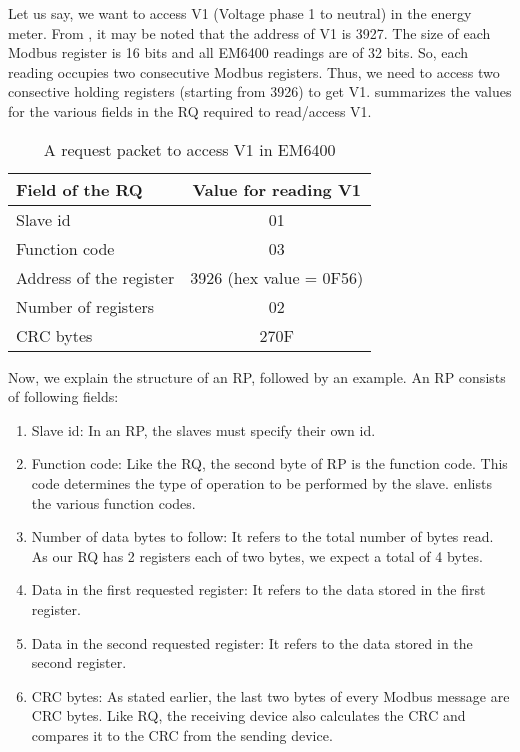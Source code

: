 Let us say, we want to access V1 (Voltage phase 1 to neutral) in the 
energy meter. From , it may be noted that the address of V1 is 3927. The size of each Modbus register is 16 bits and all EM6400 readings
are of 32 bits. So, each reading occupies two consecutive Modbus
registers. Thus, we need to access two consective holding registers 
(starting from 3926) to get V1.  summarizes the 
values for the various fields in the RQ required to read/access V1.  
\begin{table}
  \centering
  \caption{A request packet to access V1 in EM6400}
  \label{tab:params-rq}
  \begin{tabular}{lc}\hline
    Field of the RQ         & Value for reading V1    \\ \hline 
    Slave id                & 01                      \\
    Function code           & 03                      \\ 
    Address of the register & 3926 (hex value = 0F56) \\
    Number of registers     & 02                      \\
    CRC bytes               & 270F                    \\
    \hline 
  \end{tabular}
\end{table}
Now, we explain the structure of an RP, followed by an example. 
An RP consists of following fields: 
\begin{enumerate}
  \item Slave id: In an RP, the slaves must specify their own id.
  \item Function code: Like the RQ, the second byte of RP is the function code.
        This code determines the type of operation to be 
        performed by the slave.  enlists the various 
        function codes. 
  \item Number of data bytes to follow: It refers to the total number of bytes
        read. As our RQ has 2 registers each of two bytes, we expect a total of 4 bytes. 
  \item Data in the first requested register: It refers to the data stored
        in the first register. 
  \item Data in the second requested register: It refers to the data stored
        in the second register. 
  \item CRC bytes: As stated earlier, the last two bytes of every Modbus message are CRC
        bytes. Like RQ, the receiving device also calculates the CRC and compares it to the 
        CRC from the sending device. 
\end{enumerate}

